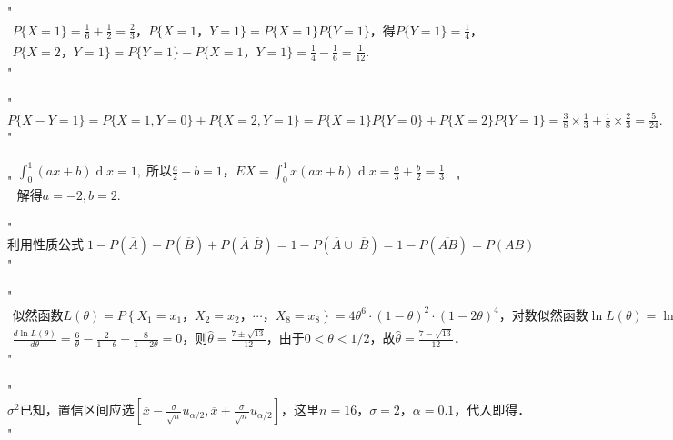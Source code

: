 "$\begin{array}{l}P\{X=1\}=\frac16+\frac12=\frac23，P\{X=1，Y=1\}=P\{X=1\}P\{Y=1\}，得P\{Y=1\}=\frac14，\\P\{X=2，Y=1\}=P\{Y=1\}-P\{X=1，Y=1\}=\frac14-\frac16=\frac1{12}.\end{array}$"


"$P\{X-Y=1\}=P\{X=1,Y=0\}+P\{X=2,Y=1\}=P\{X=1\}P\{Y=0\}+P\{X=2\}P\{Y=1\}=\frac38\times\frac13+\frac18\times\frac23=\frac5{24}.$"


"$\begin{array}{l}\int_0^1(ax+b)\operatorname dx=1,\;\mathrm{所以}\frac a2+b=1，EX=\int_0^1x(ax+b)\operatorname dx=\frac a3+\frac b2=\frac13,\\\mathrm{解得}a=-2,b=2.\end{array}$"


"$\mathrm{利用性质公式}\;1-P(\overline A)-P(\overline B)+P(\overline A\;\overline B)=1-P(\overline A\cup\;\overline B)=1-P(\overline{AB})=P(AB)$"


"$\begin{array}{l}\mathrm{似然函数}L\left(\theta\right)=P\left\{X_1=x_1，X_2=x_2，\cdots，X_8=x_8\right\}=4\theta^6\cdot\left(1-\theta\right)^2\cdot\left(1-2\theta\right)^4，\mathrm{对数似然函数}\ln L\left(\theta\right)=\ln4+6\ln\theta+2\ln\left(1-\theta\right)+4\ln\left(1-2\theta\right)，\\\frac{d\ln L\left(\theta\right)}{d\theta}=\frac6\theta-\frac2{1-\theta}-\frac8{1-2\theta}=0，\mathrm 则\widehat\theta=\frac{7\pm\sqrt{13}}{12}，\mathrm{由于}0<\theta<1/2，\mathrm 故\widehat\theta=\frac{7-\sqrt{13}}{12}．\end{array}$"


"$\sigma^2\mathrm{已知}，\mathrm{置信区间应选}\left[\overline x-\frac\sigma{\sqrt n}u_{\alpha/2},\overline x+\frac\sigma{\sqrt n}u_{\alpha/2}\right]，\mathrm{这里}n=16，\sigma=2，\alpha=0.1，\mathrm{代入即得}．$"


